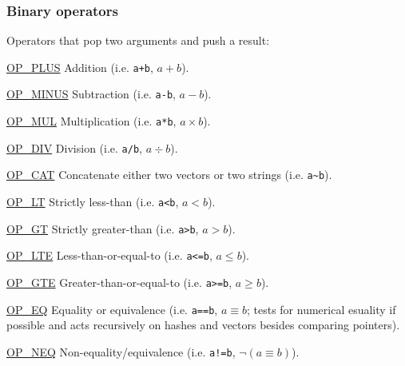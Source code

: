 \documentclass{article}
\newcommand{\OP} [1]{\hyperref[op:#1]{\textcolor{opcode}{OP\_#1}}}
\begin{document}
\subsubsection{Binary operators}
Operators that pop two arguments and push a result:
\begin{description}
    \item \OP{PLUS} \label{op:PLUS} \label{op:Plus} Addition (i.e. \verb$a+b$, $a + b$).
    \item \OP{MINUS}\label{op:MINUS}\label{op:Minus} Subtraction (i.e. \verb$a-b$, $a - b$).
    \item \OP{MUL}  \label{op:MUL} \label{op:Mul} Multiplication (i.e. \verb$a*b$, $a\times b$).
    \item \OP{DIV}  \label{op:DIV} \label{op:Div} Division (i.e. \verb$a/b$, $a\div b$).
    \item \OP{CAT}  \label{op:CAT} \label{op:Cat} Concatenate either two vectors or two strings (i.e. \verb$a~b$).
    \item \OP{LT}   \label{op:LT} \label{op:Lt} Strictly less-than (i.e. \verb$a<b$, $a < b$).
    \item \OP{GT}   \label{op:GT} \label{op:Gt} Strictly greater-than (i.e. \verb$a>b$, $a > b$).
    \item \OP{LTE}  \label{op:LTE} \label{op:Lte} Less-than-or-equal-to (i.e. \verb$a<=b$, $a\leq b$).
    \item \OP{GTE}  \label{op:GTE} \label{op:Gte} Greater-than-or-equal-to (i.e. \verb$a>=b$, $a\geq b$).
    \item \OP{EQ}   \label{op:EQ} \label{op:Eq} Equality or equivalence (i.e. \verb$a==b$, $a\equiv b$; tests for numerical esuality if possible and acts recursively on hashes and vectors besides comparing pointers).
    \item \OP{NEQ}  \label{op:NEQ}\label{op:Neq} Non-equality/equivalence (i.e. \verb$a!=b$, $\neg(a\equiv b)$).
\end{description}
\end{document}

